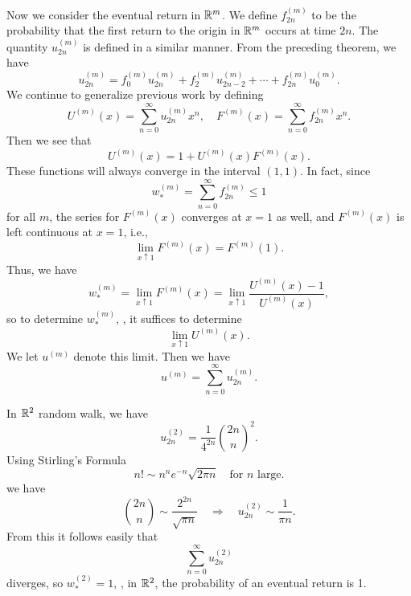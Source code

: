 Now we consider the eventual return in $\mathbb{R}^m$. We define $f_{2 n}^{(m)}$ to be the probability that the first return to the origin in $\mathbb{R}^m$ occurs at time $2n$. The quantity $u_{2 n}^{(m)}$ is defined in a similar manner. From the preceding theorem, we have 
\begin{equation*}
    u_{2 n}^{(m)}=f_{0}^{(m)} u_{2 n}^{(m)}+f_{2}^{(m)} u_{2 n-2}^{(m)}+\cdots+f_{2 n}^{(m)} u_{0}^{(m)}.
\end{equation*}
We continue to generalize previous work by defining
\begin{equation*}
    U^{(m)}(x)=\sum_{n=0}^{\infty} u_{2 n}^{(m)} x^{n}, \quad F^{(m)}(x)=\sum_{n=0}^{\infty} f_{2 n}^{(m)} x^{n}.
\end{equation*}
Then we see that 
\begin{equation*}
    U^{(m)}(x)=1+U^{(m)}(x) F^{(m)}(x).
\end{equation*}
These functions will always converge in the interval $(1, 1)$. In fact, since 
\begin{equation*}
    w_{*}^{(m)}=\sum_{n=0}^{\infty} f_{2 n}^{(m)} \leq 1
\end{equation*}
for all $m$, the series for $F^{(m)}(x)$ converges at $x = 1$ as well, and $F^{(m)}(x)$ is left continuous at $x = 1$, i.e.,
\begin{equation*}
    \lim _{x \uparrow 1} F^{(m)}(x)=F^{(m)}(1).
\end{equation*}
Thus, we have
\begin{equation}
    \label{eq:9.2}
    \tag{9-2}
    w_{*}^{(m)}=\lim _{x \uparrow 1} F^{(m)}(x)=\lim _{x \uparrow 1} \frac{U^{(m)}(x)-1}{U^{(m)}(x)},
\end{equation}
so to determine $w_{*}^{(m)}$, , it suffices to determine 
\begin{equation*}
    \lim _{x \uparrow 1} U^{(m)}(x).
\end{equation*}
We let $u^{(m)}$ denote this limit. Then we have 
\begin{equation}
    \label{eq:9.3}
    \tag{9-3}
    u^{(m)}=\sum_{n=0}^{\infty} u_{2 n}^{(m)}.
\end{equation}

In $\mathbb{R}^2$ random walk, we have
\begin{equation*}
    u_{2 n}^{(2)}=\frac{1}{4^{2 n}} \binom{2n}{n}^2. 
\end{equation*}
Using Stirling’s Formula
\begin{equation}
    \label{eq:Stirling}
    \tag{Stirling}
    n! \sim n^n e^{-n} \sqrt{2\pi n} \quad \text{for  $n$  large.}
\end{equation}
we have
\begin{equation*}
    \binom{2n}{n} \sim \frac{2^{2 n}}{\sqrt{\pi n}} \quad \Rightarrow \quad 
    u_{2 n}^{(2)} \sim \frac{1}{\pi n}.
\end{equation*}
From this it follows easily that 
\begin{equation*}
    \sum_{n=0}^{\infty} u_{2 n}^{(2)}
\end{equation*}
diverges, so $w_{*}^{(2)}=1$, \ie, in $\mathbb{R}^2$, the probability of an eventual return is 1.

